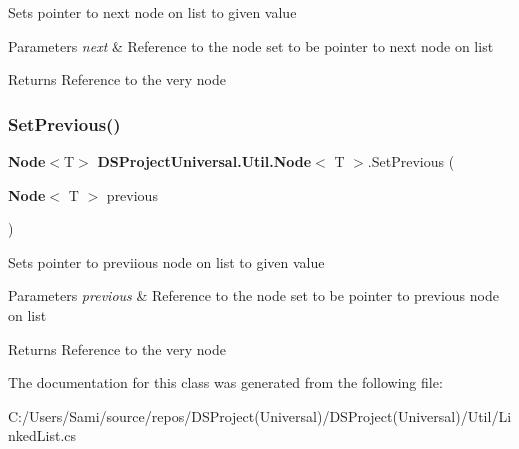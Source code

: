 Sets pointer to next node on list to given value


\begin{DoxyParams}{Parameters}
{\em next} & Reference to the node set to be pointer to next node on list\\
\hline
\end{DoxyParams}
\begin{DoxyReturn}{Returns}
Reference to the very node
\end{DoxyReturn}
\mbox{\label{class_d_s_project_universal_1_1_util_1_1_node_acb8111bb0b6db39c5e872498b9c42059}} 
\subsubsection{Set\+Previous()}
{\footnotesize\ttfamily \textbf{ Node}$<$T$>$ \textbf{ D\+S\+Project\+Universal.\+Util.\+Node}$<$ T $>$.Set\+Previous (\begin{DoxyParamCaption}\item[{\textbf{ Node}$<$ T $>$}]{previous }\end{DoxyParamCaption})}



Sets pointer to previious node on list to given value


\begin{DoxyParams}{Parameters}
{\em previous} & Reference to the node set to be pointer to previous node on list\\
\hline
\end{DoxyParams}
\begin{DoxyReturn}{Returns}
Reference to the very node
\end{DoxyReturn}


The documentation for this class was generated from the following file\+:\begin{DoxyCompactItemize}
\item 
C\+:/\+Users/\+Sami/source/repos/\+D\+S\+Project(\+Universal)/\+D\+S\+Project(\+Universal)/\+Util/Linked\+List.\+cs\end{DoxyCompactItemize}
